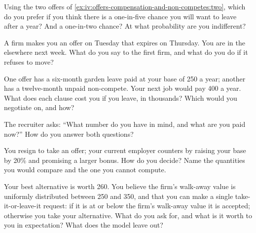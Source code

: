 \begin{interviewq}\label{iq:iv:offers-compensation-and-non-competes:4}
Using the two offers of \cref{ex:iv:offers-compensation-and-non-competes:two}, which do you prefer if you
think there is a one-in-five chance you will want to leave after a year? And a one-in-two chance? At what
probability are you indifferent?
\end{interviewq}

\begin{interviewq}\label{iq:iv:offers-compensation-and-non-competes:5}
A firm makes you an offer on Tuesday that expires on Thursday. You are in the  elsewhere next
week. What do you say to the first firm, and what do you do if it refuses to move?
\end{interviewq}

\begin{interviewq}\label{iq:iv:offers-compensation-and-non-competes:6}
One offer has a six-month garden leave paid at your base of 250 a year; another has a twelve-month unpaid
non-compete. Your next job would pay 400 a year. What does each clause cost you if you leave, in thousands?
Which would you negotiate on, and how?
\end{interviewq}

\begin{interviewq}\label{iq:iv:offers-compensation-and-non-competes:7}
The recruiter asks: ``What number do you have in mind, and what are you paid now?'' How do you answer both
questions?
\end{interviewq}

\begin{interviewq}\label{iq:iv:offers-compensation-and-non-competes:8}
You resign to take an offer; your current employer counters by raising your base by 20\% and promising a
larger bonus. How do you decide? Name the quantities you would compare and the one you cannot compute.
\end{interviewq}

\begin{interviewq}\label{iq:iv:offers-compensation-and-non-competes:9}
Your best alternative is worth 260. You believe the firm's walk-away value is uniformly distributed between
250 and 350, and that you can make a single take-it-or-leave-it request: if it is at or below the firm's
walk-away value it is accepted; otherwise you take your alternative. What do you ask for, and what is it worth
to you in expectation? What does the model leave out?
\end{interviewq}

